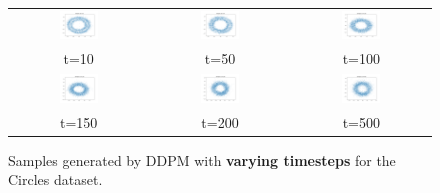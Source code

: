 \documentclass[11pt]{article}
\begin{document}
\begin{figure}[ht]
    \centering
    \begin{tabular}{ccc}
        \includegraphics[width=0.3\textwidth]{exps/ddpm_2_10_0.0001_0.02_circles/samples_10.png} &
        \includegraphics[width=0.3\textwidth]{exps/ddpm_2_50_0.0001_0.02_circles/samples_50.png} &
        \includegraphics[width=0.3\textwidth]{exps/ddpm_2_100_0.0001_0.02_circles/samples_100.png} \\
        t=10 & t=50 & t=100 \\[0.5em]
        
        \includegraphics[width=0.3\textwidth]{exps/ddpm_2_150_0.0001_0.02_circles/samples_150.png} &
        \includegraphics[width=0.3\textwidth]{exps/ddpm_2_200_0.0001_0.02_circles/samples_200.png} &
        \includegraphics[width=0.3\textwidth]{exps/ddpm_2_500_0.0001_0.02_circles/samples_500.png} \\
        t=150 & t=200 & t=500 \\
    \end{tabular}
    \caption{Samples generated by DDPM with \textbf{varying timesteps} for the Circles dataset.}
    \label{fig:timesteps_circles}
\end{figure}
\end{document}
